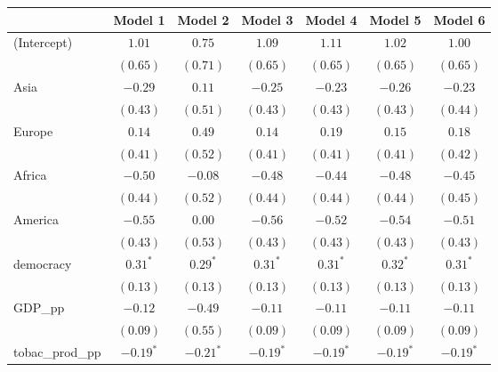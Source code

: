 
\begin{table}[!h]
\begin{center}
\begin{tabular}{l c c c c c c }
\toprule
 & Model 1 & Model 2 & Model 3 & Model 4 & Model 5 & Model 6 \\
\midrule
(Intercept)             & $1.01$       & $0.75$       & $1.09$       & $1.11$       & $1.02$       & $1.00$       \\
                        & $(0.65)$     & $(0.71)$     & $(0.65)$     & $(0.65)$     & $(0.65)$     & $(0.65)$     \\
Asia                    & $-0.29$      & $0.11$       & $-0.25$      & $-0.23$      & $-0.26$      & $-0.23$      \\
                        & $(0.43)$     & $(0.51)$     & $(0.43)$     & $(0.43)$     & $(0.43)$     & $(0.44)$     \\
Europe                  & $0.14$       & $0.49$       & $0.14$       & $0.19$       & $0.15$       & $0.18$       \\
                        & $(0.41)$     & $(0.52)$     & $(0.41)$     & $(0.41)$     & $(0.41)$     & $(0.42)$     \\
Africa                  & $-0.50$      & $-0.08$      & $-0.48$      & $-0.44$      & $-0.48$      & $-0.45$      \\
                        & $(0.44)$     & $(0.52)$     & $(0.44)$     & $(0.44)$     & $(0.44)$     & $(0.45)$     \\
America                 & $-0.55$      & $0.00$       & $-0.56$      & $-0.52$      & $-0.54$      & $-0.51$      \\
                        & $(0.43)$     & $(0.53)$     & $(0.43)$     & $(0.43)$     & $(0.43)$     & $(0.43)$     \\
democracy               & $0.31^{*}$   & $0.29^{*}$   & $0.31^{*}$   & $0.31^{*}$   & $0.32^{*}$   & $0.31^{*}$   \\
                        & $(0.13)$     & $(0.13)$     & $(0.13)$     & $(0.13)$     & $(0.13)$     & $(0.13)$     \\
GDP\_pp                 & $-0.12$      & $-0.49$      & $-0.11$      & $-0.11$      & $-0.11$      & $-0.11$      \\
                        & $(0.09)$     & $(0.55)$     & $(0.09)$     & $(0.09)$     & $(0.09)$     & $(0.09)$     \\
tobac\_prod\_pp         & $-0.19^{*}$  & $-0.21^{*}$  & $-0.19^{*}$  & $-0.19^{*}$  & $-0.19^{*}$  & $-0.19^{*}$  \\

\end{tabular}
\end{center}
\end{table}
